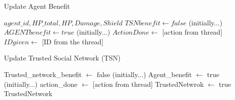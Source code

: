  
    
    

\begin{algorithm}
\caption{Update Agent Benefit}
\begin{algorithmic}
\Require $agent\_id, HP\_total, HP, Damage, Shield$
\State $TSNbenefit \leftarrow false$ (initially...)
\State $AGENTbenefit \leftarrow true$ (initially...)
\State $ActionDone \leftarrow$ [action from thread]
\State $IDgiven \leftarrow$ [ID from the thread]
\end{algorithmic}
\end{algorithm}

\begin{algorithm}
\caption{Update Trusted Social Network (TSN)}
\begin{algorithmic}
\State Trusted\_network\_benefit $ \leftarrow $ false (initially...)
\State Agent\_benefit $ \leftarrow $ true (initially...)
\State action\_done $ \leftarrow $ [action from thread]
\State TrustedNetwrok $ \leftarrow $ true
\EndIf
\State
\Return TrustedNetwork
\end{algorithmic}
\end{algorithm}



